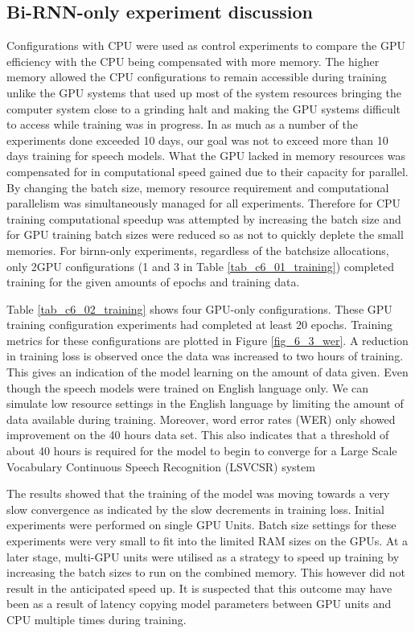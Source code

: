\subsection{Bi-RNN-only experiment discussion}
Configurations with CPU were used as control experiments to compare the GPU efficiency with the CPU being compensated with more memory.  The higher memory allowed the CPU configurations to remain accessible during training unlike the GPU systems that used up most of the system resources bringing the computer system close to a grinding halt and making the GPU systems difficult to access while training was in progress.  In as much as a number of the experiments done exceeded 10 days, our goal was not to exceed more than 10 days training for speech models.  What the GPU lacked in memory resources was compensated for in computational speed gained due to their capacity for parallel.  By changing the batch size, memory resource requirement and computational parallelism was simultaneously managed for all experiments.  Therefore for CPU training computational speedup was attempted by increasing the batch size and for GPU training batch sizes were reduced so as not to quickly deplete the small memories.  For \acrshort{birnn}-only experiments, regardless of the batchsize allocations, only 2GPU configurations  (1 and 3 in Table \ref{tab_c6_01_training}) completed training for the given amounts of epochs and training data.

Table \ref{tab_c6_02_training} shows four GPU-only configurations.  These GPU training configuration experiments had completed at least 20 epochs.  Training metrics for these configurations are plotted in Figure \ref{fig_6_3_wer}.   A reduction in training loss is observed once the data was increased to two hours of training.  This gives an indication of the model learning on the amount of data given.  Even though the speech models were trained on English language only.  We can simulate low resource settings in the English language by limiting the amount of data available during training.  Moreover, word error rates (WER) only showed improvement on the 40 hours data set.  This also indicates that a threshold of about 40 hours is required for the model to begin to converge for a Large Scale Vocabulary Continuous Speech Recognition (LSVCSR) system

The results showed that the training of the model was moving towards a very slow convergence as indicated by the slow decrements in training loss.  Initial experiments were performed on single GPU Units.  Batch size settings for these experiments were very small to fit into the limited RAM sizes on the GPUs.  At a later stage, multi-GPU units were utilised as a strategy to speed up training by increasing the batch sizes to run on the combined memory.  This however did not result in the anticipated speed up. It is suspected that this outcome may have been as a result of latency copying model parameters between GPU units and CPU multiple times during training.

